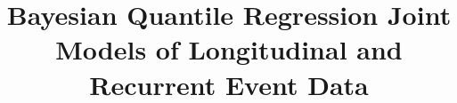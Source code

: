 \documentclass[12pt]{article}
\usepackage[letterpaper, left=1.25in, right=1.0in, top=1.25in, bottom=1.1in]{geometry} %
\usepackage{fullpage,setspace}
\usepackage{hyperref, url}
\usepackage[hang,flushmargin]{footmisc} %
\usepackage{amssymb,amsmath}%
\usepackage{graphicx,float,morefloats,rotfloat,lscape}%
\usepackage{subfig}
\usepackage{multirow}
\usepackage{longtable,rotating}
\usepackage{caption}
\usepackage{color}
\usepackage[round]{natbib} %
\usepackage{listings}
\usepackage{courier}
\usepackage{color}
\usepackage{mwe}
\captionsetup[subtable]{font=normal}
\usepackage[export]{adjustbox}
\usepackage{bm}
\usepackage{appendix}

\usepackage[absolute]{textpos}
\usepackage{fancyhdr}

\usepackage{titling}
\pretitle{\begin{center}\huge}
\posttitle{\par\end{center}}
\postauthor{\end{tabular}\end{center}}

\setlength{\parindent}{0em}
\setlength{\parskip}{0.5em}
\captionsetup[subtable]{font=normal}
\graphicspath{{0.plots/}}
\doublespace





\title{Bayesian Quantile Regression Joint Models of Longitudinal and Recurrent Event Data}



